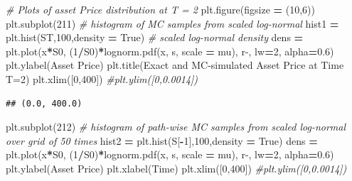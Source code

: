 \documentclass[
]{book}
\newenvironment{Shaded}{\begin{snugshade}}{\end{snugshade}}
\newcommand{\CommentTok}[1]{\textcolor[rgb]{0.56,0.35,0.01}{\textit{#1}}}
\newcommand{\DecValTok}[1]{\textcolor[rgb]{0.00,0.00,0.81}{#1}}
\newcommand{\FloatTok}[1]{\textcolor[rgb]{0.00,0.00,0.81}{#1}}
\newcommand{\NormalTok}[1]{#1}
\newcommand{\OperatorTok}[1]{\textcolor[rgb]{0.81,0.36,0.00}{\textbf{#1}}}
\newcommand{\StringTok}[1]{\textcolor[rgb]{0.31,0.60,0.02}{#1}}
\newcommand{\VariableTok}[1]{\textcolor[rgb]{0.00,0.00,0.00}{#1}}
\begin{document}
\begin{Shaded}
\begin{Highlighting}[]
\CommentTok{\# Plots of asset Price distribution at T = 2}
\NormalTok{plt.figure(figsize }\OperatorTok{=}\NormalTok{ (}\DecValTok{10}\NormalTok{,}\DecValTok{6}\NormalTok{))}
\NormalTok{plt.subplot(}\DecValTok{211}\NormalTok{)}
\CommentTok{\# histogram of MC samples from scaled log{-}normal}
\NormalTok{hist1 }\OperatorTok{=}\NormalTok{ plt.hist(ST,}\DecValTok{100}\NormalTok{,density }\OperatorTok{=} \VariableTok{True}\NormalTok{)}
\CommentTok{\# scaled log{-}normal density}
\NormalTok{dens }\OperatorTok{=}\NormalTok{ plt.plot(x}\OperatorTok{*}\NormalTok{S0, (}\DecValTok{1}\OperatorTok{/}\NormalTok{S0)}\OperatorTok{*}\NormalTok{lognorm.pdf(x, s, scale }\OperatorTok{=}\NormalTok{ mu),}
       \StringTok{\textquotesingle{}r{-}\textquotesingle{}}\NormalTok{, lw}\OperatorTok{=}\DecValTok{2}\NormalTok{, alpha}\OperatorTok{=}\FloatTok{0.6}\NormalTok{)}
\NormalTok{plt.ylabel(}\StringTok{\textquotesingle{}Asset Price\textquotesingle{}}\NormalTok{)}
\NormalTok{plt.title(}\StringTok{\textquotesingle{}Exact and MC{-}simulated Asset Price at Time T=2\textquotesingle{}}\NormalTok{)}
\NormalTok{plt.xlim([}\DecValTok{0}\NormalTok{,}\DecValTok{400}\NormalTok{])}
\CommentTok{\#plt.ylim([0,0.0014])}
\end{Highlighting}
\end{Shaded}

\begin{verbatim}
## (0.0, 400.0)
\end{verbatim}

\begin{Shaded}
\begin{Highlighting}[]
\NormalTok{plt.subplot(}\DecValTok{212}\NormalTok{)}
\CommentTok{\# histogram of path{-}wise MC samples from scaled log{-}normal over grid of 50 times}
\NormalTok{hist2 }\OperatorTok{=}\NormalTok{ plt.hist(S[}\OperatorTok{{-}}\DecValTok{1}\NormalTok{],}\DecValTok{100}\NormalTok{,density }\OperatorTok{=} \VariableTok{True}\NormalTok{)}
\NormalTok{dens }\OperatorTok{=}\NormalTok{ plt.plot(x}\OperatorTok{*}\NormalTok{S0, (}\DecValTok{1}\OperatorTok{/}\NormalTok{S0)}\OperatorTok{*}\NormalTok{lognorm.pdf(x, s, scale }\OperatorTok{=}\NormalTok{ mu),}
       \StringTok{\textquotesingle{}r{-}\textquotesingle{}}\NormalTok{, lw}\OperatorTok{=}\DecValTok{2}\NormalTok{, alpha}\OperatorTok{=}\FloatTok{0.6}\NormalTok{)}
\NormalTok{plt.ylabel(}\StringTok{\textquotesingle{}Asset Price\textquotesingle{}}\NormalTok{)}
\NormalTok{plt.xlabel(}\StringTok{\textquotesingle{}Time\textquotesingle{}}\NormalTok{)}
\NormalTok{plt.xlim([}\DecValTok{0}\NormalTok{,}\DecValTok{400}\NormalTok{])}
\CommentTok{\#plt.ylim([0,0.0014])}
\end{Highlighting}
\end{Shaded}
\end{document}
